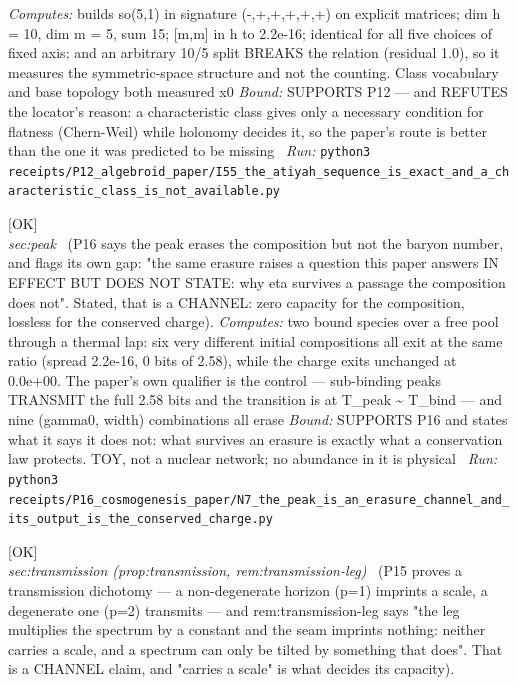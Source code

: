 \begin{description}
\emph{Computes:} builds so(5,1) in signature (-,+,+,+,+,+) on explicit matrices; dim h = 10, dim m = 5, sum 15; [m,m] in h to 2.2e-16; identical for all five choices of fixed axis; and an arbitrary 10/5 split BREAKS the relation (residual 1.0), so it measures the symmetric-space structure and not the counting. Class vocabulary and base topology both measured x0
 \emph{Bound:} SUPPORTS P12 --- and REFUTES the locator's reason: a characteristic class gives only a necessary condition for flatness (Chern-Weil) while holonomy decides it, so the paper's route is better than the one it was predicted to be missing
\ \emph{Run:} \texttt{python3 receipts/P12\_algebroid\_paper/I55\_the\_atiyah\_sequence\_is\_exact\_and\_a\_characteristic\_class\_is\_not\_available.py}
\item[\label{rcpt:N7_the_peak_is_an_erasure_channel_and_its_output_is_the_conserved_charge}\texttt{N7\_the\_peak\_is\_an\_erasure\_channel\_and\_its\_output\_is\_the\_conserved\_charge}]\hfill\textsf{[OK]}\\
\textit{sec:peak} \ (P16 says the peak erases the composition but not the baryon number, and flags its own gap: "the same erasure raises a question this paper answers IN EFFECT BUT DOES NOT STATE: why eta survives a passage the composition does not". Stated, that is a CHANNEL: zero capacity for the composition, lossless for the conserved charge). 
\emph{Computes:} two bound species over a free pool through a thermal lap: six very different initial compositions all exit at the same ratio (spread 2.2e-16, 0 bits of 2.58), while the charge exits unchanged at 0.0e+00. The paper's own qualifier is the control --- sub-binding peaks TRANSMIT the full 2.58 bits and the transition is at T\_peak \textasciitilde{} T\_bind --- and nine (gamma0, width) combinations all erase
 \emph{Bound:} SUPPORTS P16 and states what it says it does not: what survives an erasure is exactly what a conservation law protects. TOY, not a nuclear network; no abundance in it is physical
\ \emph{Run:} \texttt{python3 receipts/P16\_cosmogenesis\_paper/N7\_the\_peak\_is\_an\_erasure\_channel\_and\_its\_output\_is\_the\_conserved\_charge.py}
\item[\label{rcpt:N8_the_transmission_dichotomy_is_a_capacity_dichotomy}\texttt{N8\_the\_transmission\_dichotomy\_is\_a\_capacity\_dichotomy}]\hfill\textsf{[OK]}\\
\textit{sec:transmission (prop:transmission, rem:transmission-leg)} \ (P15 proves a transmission dichotomy --- a non-degenerate horizon (p=1) imprints a scale, a degenerate one (p=2) transmits --- and rem:transmission-leg says "the leg multiplies the spectrum by a constant and the seam imprints nothing: neither carries a scale, and a spectrum can only be tilted by something that does". That is a CHANNEL claim, and "carries a scale" is what decides its capacity). 

\end{description}

